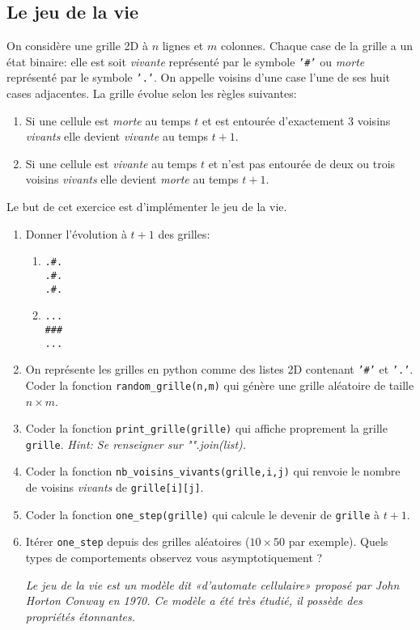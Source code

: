 \subsection{Le jeu de la vie}

On considère une grille 2D à $n$ lignes et $m$ colonnes. Chaque case de la grille a un état binaire: elle est soit \textit{vivante} représenté par le symbole \texttt{'\#'} ou \textit{morte} représenté par le symbole \texttt{'.'}. On appelle voisins d'une case l'une de ses huit cases adjacentes. La grille évolue selon les règles suivantes:

\begin{enumerate}
\item Si une cellule est \textit{morte} au temps $t$ et est entourée d'exactement 3 voisins \textit{vivants} elle devient \textit{vivante} au temps $t+1$.
\item Si une cellule est \textit{vivante} au temps $t$ et n'est pas entourée de deux ou trois voisins \textit{vivants} elle devient \textit{morte} au temps $t+1$.
\end{enumerate}

Le but de cet exercice est d'implémenter le jeu de la vie.

\begin{enumerate}
\item Donner l'évolution à $t+1$ des grilles:
\begin{enumerate}
\item
\begin{verbatim}
.#.
.#.
.#.
\end{verbatim}
\item
\begin{verbatim}
...
###
...
\end{verbatim}
\end{enumerate}

\item On représente les grilles en python comme des listes 2D contenant \texttt{'\#'} et \texttt{'.'}. Coder la fonction \texttt{random\_grille(n,m)} qui génère une grille aléatoire de taille $n\times m$.

\item Coder la fonction \texttt{print\_grille(grille)} qui affiche proprement la grille \texttt{grille}. \textit{Hint: Se renseigner sur "".join(list).}

\item Coder la fonction \texttt{nb\_voisins\_vivants(grille,i,j)} qui renvoie le nombre de voisins \textit{vivants} de \texttt{grille[i][j]}.

\item Coder la fonction \texttt{one\_step(grille)} qui calcule le devenir de \texttt{grille} à $t+1$.

\item Itérer \texttt{one\_step} depuis des grilles aléatoires ($10\times 50$ par exemple). Quels types de comportements observez vous asymptotiquement ?

\textit{Le jeu de la vie est un modèle dit «d'automate cellulaire» proposé par John Horton Conway en 1970. Ce modèle a été très étudié, il possède des propriétés étonnantes.}

\end{enumerate}
